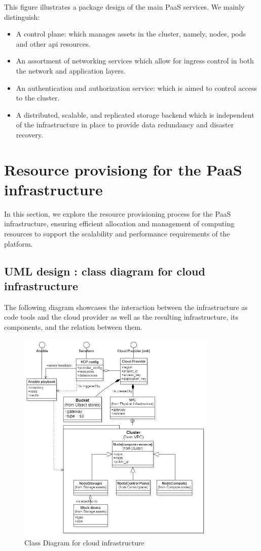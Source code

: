 \hspace{7mm}This figure illustrates a package design of the main PaaS services. We mainly distinguish: 
\begin{itemize}[label={--}]
\item  A control plane: which manages assets in the cluster, namely, nodes, pods and other api resources. 
\item An assortment of networking services which allow for ingress control in both the network and application layers. 
\item An authentication and authorization service: which is aimed to control access to the cluster. 
\item A distributed, scalable, and replicated storage backend which is independent of the infrastructure in place to provide data redundancy and disaster recovery. 
\end{itemize}
\newpage
\section{Resource provisiong for the PaaS infrastructure}

\hspace{7mm}In this section, we explore the resource provisioning process for the PaaS infrastructure, ensuring efficient allocation and management of computing resources to support the scalability and performance requirements of the platform.

\subsection{UML design : class diagram for cloud infrastructure }
\hspace{7mm}The following diagram showcases the interaction between the infrastructure as code tools and the cloud provider as well as the resulting infrastructure, its components, and the relation between them. 
\begin{figure}[H]\centering
\includegraphics[width=0.85\textwidth,angle=00]{assets/f13.png}
\caption{Class Diagram for cloud infrastructure}
\label{fig:fig13}
\end{figure}

